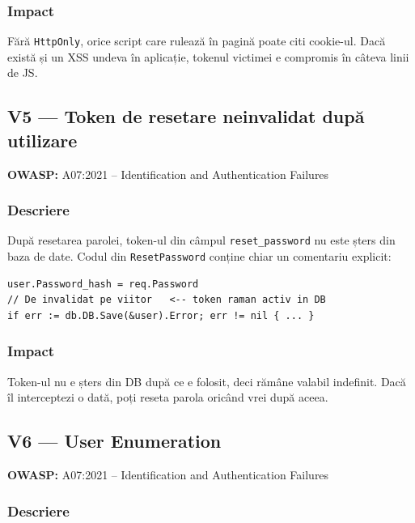 \documentclass[12pt]{article}
\begin{document}
\subsubsection*{Impact}

Fără \texttt{HttpOnly}, orice script care rulează în pagină poate citi cookie-ul.
Dacă există și un XSS undeva în aplicație, tokenul victimei e compromis în câteva linii de JS.

\subsection{V5 --- Token de resetare neinvalidat după utilizare}

\textbf{OWASP:} A07:2021 -- Identification and Authentication Failures

\subsubsection*{Descriere}

După resetarea parolei, token-ul din câmpul \texttt{reset\_password} nu este șters
din baza de date. Codul din \texttt{ResetPassword} conține chiar un comentariu
explicit:

\begin{verbatim}
user.Password_hash = req.Password
// De invalidat pe viitor   <-- token raman activ in DB
if err := db.DB.Save(&user).Error; err != nil { ... }
\end{verbatim}

\subsubsection*{Impact}

Token-ul nu e șters din DB după ce e folosit, deci rămâne valabil indefinit.
Dacă îl interceptezi o dată, poți reseta parola oricând vrei după aceea.

\subsection{V6 --- User Enumeration}

\textbf{OWASP:} A07:2021 -- Identification and Authentication Failures

\subsubsection*{Descriere}
\end{document}
